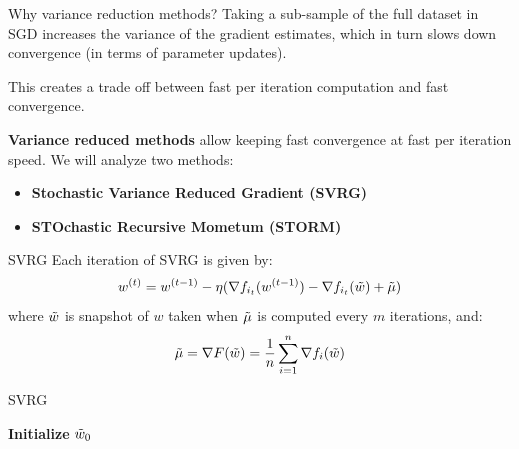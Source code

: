 \documentclass[10pt]{beamer}
\begin{document}
\begin{frame}{Why variance reduction methods?}
    Taking a sub-sample of the full dataset in SGD increases the variance of the gradient estimates, which in turn slows down convergence (in terms of parameter updates). 
    
    \vspace{5mm}
    This creates a trade off between fast per iteration computation and fast convergence.
    
    \vspace{5mm}
    \textbf{Variance reduced methods} allow keeping fast convergence at fast per iteration speed. We will analyze two methods:
    \begin{itemize}
        \item \textbf{Stochastic Variance Reduced Gradient (SVRG)}~\citep{johnson2013svrg}
        \item \textbf{STOchastic Recursive Mometum (STORM)}~\citep{Cutkosky2019storm}
    \end{itemize}
    
\end{frame}

\begin{frame}{SVRG}
    Each iteration of SVRG is given by:
    $$w^{(t)} = w^{(t-1)} -\eta(\nabla f_{i_t}(w^{(t-1)}) - \nabla f_{i_t}(\Tilde{w}) + \Tilde{\mu})$$
    where $\Tilde{w}$ is snapshot of $w$ taken when $\Tilde{\mu}$ is computed every $m$ iterations, and:
    $$\Tilde{\mu} = \nabla F(\Tilde{w}) = \frac{1}{n}\sum_{i=1}^n \nabla f_i(\Tilde{w})$$
\end{frame}


\begin{frame}{SVRG}
    \begin{algorithm}[H]
    \DontPrintSemicolon
    \SetAlgoNoLine
    
    \textbf{Initialize} $\Tilde{w}_0$\;
    \caption{{\textsc{SVRG Procedure}}}
    \label{algo:svrg}
\end{algorithm}
\end{frame}
\end{document}
